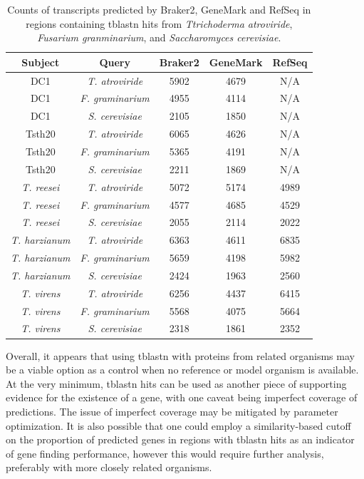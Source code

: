 \begin{table}
  \centering
  \begin{tabular}{|c|c|c|c|c|}
    \hline
    Subject & Query & Braker2 & GeneMark & RefSeq \\ \hline
    DC1 & \textit{T. atroviride} & 5902 & 4679 & N/A \\ \hline
    DC1 & \textit{F. graminarium} & 4955 & 4114 & N/A \\ \hline
    DC1 & \textit{S. cerevisiae} & 2105 & 1850 & N/A \\ \hline
    Tsth20 & \textit{T. atroviride} & 6065 & 4626 & N/A \\ \hline
    Tsth20 & \textit{F. graminarium} & 5365 & 4191 & N/A \\ \hline
    Tsth20 & \textit{S. cerevisiae} & 2211 & 1869 & N/A \\ \hline
    \textit{T. reesei} & \textit{T. atroviride} & 5072 & 5174 & 4989 \\ \hline
    \textit{T. reesei} & \textit{F. graminarium} & 4577 & 4685 & 4529 \\ \hline
    \textit{T. reesei} & \textit{S. cerevisiae} & 2055 & 2114 & 2022 \\ \hline
    \textit{T. harzianum} & \textit{T. atroviride} & 6363 & 4611 & 6835 \\ \hline
    \textit{T. harzianum} & \textit{F. graminarium} & 5659 & 4198 & 5982 \\ \hline
    \textit{T. harzianum} & \textit{S. cerevisiae} & 2424 & 1963 & 2560 \\ \hline
    \textit{T. virens} & \textit{T. atroviride} & 6256 & 4437 & 6415 \\ \hline
    \textit{T. virens} & \textit{F. graminarium} & 5568 & 4075 & 5664 \\ \hline
    \textit{T. virens} & \textit{S. cerevisiae} & 2318 & 1861 & 2352 \\ \hline
  \end{tabular}
  \caption[Counts of transcripts in regions with tblastn hits]{Counts of transcripts predicted by Braker2, GeneMark and
    RefSeq in regions containing tblastn hits from
    \textit{Ttrichoderma atroviride}, \textit{Fusarium granminarium},
    and \textit{Saccharomyces cerevisiae}.}
  \label{table:tblastn-genes}
\end{table}

Overall, it appears that using tblastn with proteins from related
organisms may be a viable option as a control when no reference or
model organism is available. At the very minimum, tblastn hits can be
used as another piece of supporting evidence for the existence of a
gene, with one caveat being imperfect coverage of predictions. The
issue of imperfect coverage may be mitigated by parameter
optimization. It is also possible that one could employ a
similarity-based cutoff on the proportion of predicted genes in
regions with tblastn hits as an indicator of gene finding performance,
however this would require further analysis, preferably with more
closely related organisms.
